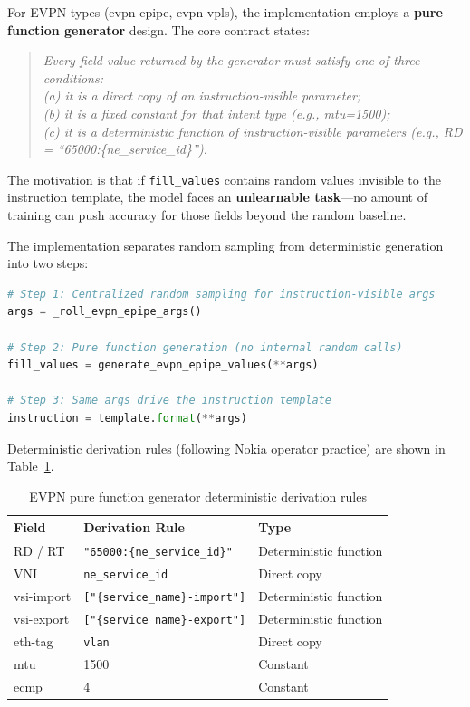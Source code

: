 \documentclass[12pt, a4paper]{article}
\newcommand{\fillvalues}{\texttt{fill\_values}}
\begin{document}
For EVPN types (evpn-epipe, evpn-vpls), the implementation employs a \textbf{pure function generator} design. The core contract states:

\begin{quote}
\itshape
Every field value returned by the generator must satisfy one of three conditions:\\
(a) it is a direct copy of an instruction-visible parameter;\\
(b) it is a fixed constant for that intent type (e.g., mtu=1500);\\
(c) it is a deterministic function of instruction-visible parameters (e.g., RD = ``65000:\{ne\_service\_id\}'').
\end{quote}

\noindent
The motivation is that if \fillvalues{} contains random values invisible to the instruction template, the model faces an \textbf{unlearnable task}---no amount of training can push accuracy for those fields beyond the random baseline.

The implementation separates random sampling from deterministic generation into two steps:

\begin{lstlisting}[language=Python, caption={Pure function generator: two-step separation}]
# Step 1: Centralized random sampling for instruction-visible args
args = _roll_evpn_epipe_args()

# Step 2: Pure function generation (no internal random calls)
fill_values = generate_evpn_epipe_values(**args)

# Step 3: Same args drive the instruction template
instruction = template.format(**args)
\end{lstlisting}

\noindent
Deterministic derivation rules (following Nokia operator practice) are shown in Table~\ref{tab:deterministic-rules}.

\begin{table}[H]
\centering
\caption{EVPN pure function generator deterministic derivation rules}
\label{tab:deterministic-rules}
\small
\begin{tabular}{lll}
\toprule
\textbf{Field} & \textbf{Derivation Rule} & \textbf{Type} \\
\midrule
RD / RT            & \texttt{"65000:\{ne\_service\_id\}"} & Deterministic function \\
VNI                & \texttt{ne\_service\_id}             & Direct copy \\
vsi-import         & \texttt{["\{service\_name\}-import"]} & Deterministic function \\
vsi-export         & \texttt{["\{service\_name\}-export"]} & Deterministic function \\
eth-tag            & \texttt{vlan}                        & Direct copy \\
mtu                & 1500                                  & Constant \\
ecmp               & 4                                     & Constant \\
\bottomrule
\end{tabular}
\end{table}
\end{document}
